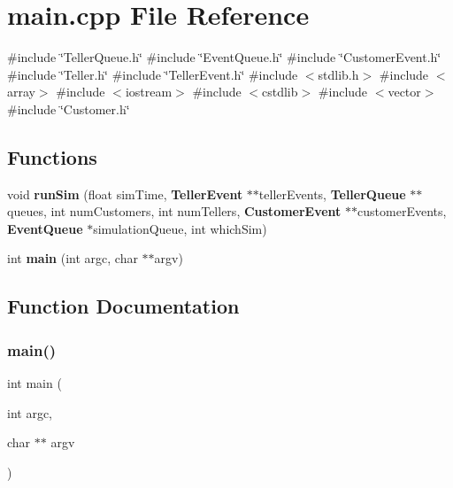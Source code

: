 \section{main.\+cpp File Reference}
\label{main_8cpp}
{\ttfamily \#include \char`\"{}Teller\+Queue.\+h\char`\"{}}\newline
{\ttfamily \#include \char`\"{}Event\+Queue.\+h\char`\"{}}\newline
{\ttfamily \#include \char`\"{}Customer\+Event.\+h\char`\"{}}\newline
{\ttfamily \#include \char`\"{}Teller.\+h\char`\"{}}\newline
{\ttfamily \#include \char`\"{}Teller\+Event.\+h\char`\"{}}\newline
{\ttfamily \#include $<$stdlib.\+h$>$}\newline
{\ttfamily \#include $<$array$>$}\newline
{\ttfamily \#include $<$iostream$>$}\newline
{\ttfamily \#include $<$cstdlib$>$}\newline
{\ttfamily \#include $<$vector$>$}\newline
{\ttfamily \#include \char`\"{}Customer.\+h\char`\"{}}\newline
\subsection*{Functions}
\begin{DoxyCompactItemize}
\item 
void \textbf{ run\+Sim} (float sim\+Time, \textbf{ Teller\+Event} $\ast$$\ast$teller\+Events, \textbf{ Teller\+Queue} $\ast$$\ast$queues, int num\+Customers, int num\+Tellers, \textbf{ Customer\+Event} $\ast$$\ast$customer\+Events, \textbf{ Event\+Queue} $\ast$simulation\+Queue, int which\+Sim)
\item 
int \textbf{ main} (int argc, char $\ast$$\ast$argv)
\end{DoxyCompactItemize}


\subsection{Function Documentation}
\mbox{\label{main_8cpp_a3c04138a5bfe5d72780bb7e82a18e627}} 
\subsubsection{main()}
{\footnotesize\ttfamily int main (\begin{DoxyParamCaption}\item[{int}]{argc,  }\item[{char $\ast$$\ast$}]{argv }\end{DoxyParamCaption})}



